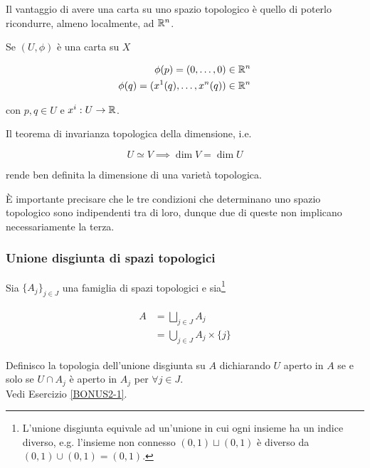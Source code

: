 Il vantaggio di avere una carta su uno spazio topologico è quello di poterlo ricondurre, almeno localmente, ad $ \mathbb{R}^{n} $.

\begin{remark}
	Se $ (U,\phi) $ è una carta su $ X $
	
	\begin{align}
		\begin{split}
			\phi(p) = (0,\dots,0) \in \mathbb{R}^{n}\\
			\phi(q) = (x^{1}(q),\dots,x^{n}(q)) \in \mathbb{R}^{n}
		\end{split}
	\end{align}

	con $ p,q \in U $ e $ x^{i} : U \to \mathbb{R} $.
\end{remark}

\begin{remark}
	Il teorema di invarianza topologica della dimensione, i.e.
	
	\begin{equation}
		U \simeq V \implies \dim V = \dim U
	\end{equation}

	rende ben definita la dimensione di una varietà topologica.
\end{remark}

\`{E} importante precisare che le tre condizioni che determinano uno spazio topologico sono indipendenti tra di loro, dunque due di queste non implicano necessariamente la terza.

\subsubsection{Unione disgiunta di spazi topologici}

Sia $ \{A_{j}\}_{j \in J} $ una famiglia di spazi topologici e sia\footnote{%
	L'unione disgiunta equivale ad un'unione in cui ogni insieme ha un indice diverso, e.g. l'insieme non connesso $ (0,1) \sqcup (0,1) $ è diverso da $ (0,1) \cup (0,1) = (0,1) $.}

\begin{align}
	\begin{split}
		A &= \bigsqcup_{j \in J} A_{j}\\
		&= \bigcup_{j \in J} A_{j} \times \{j\}
	\end{split}
\end{align}

Definisco la topologia dell'unione disgiunta su $ A $ dichiarando $ U $ aperto in $ A $ se e solo se $ U \cap A_{j} $ è aperto in $ A_{j} $ per $ \forall j \in J $.\\
Vedi Esercizio \ref{BONUS2-1}.

